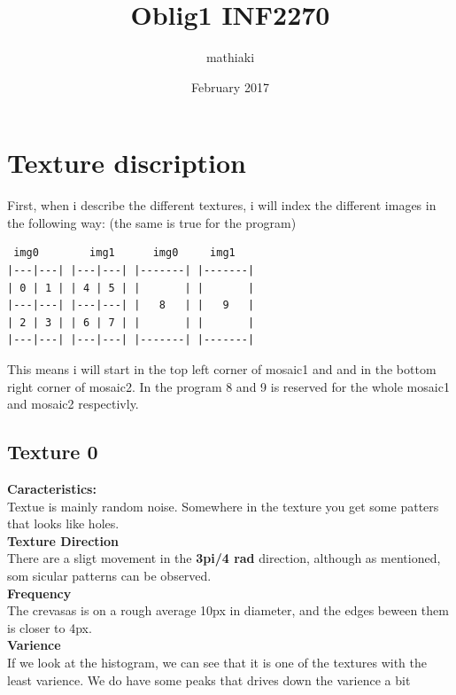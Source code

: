 \documentclass{article}
\title{Oblig1 INF2270}
\author{mathiaki}
\date{February 2017}
\begin{document}
\maketitle

\newpage
\tableofcontents
\newpage

\section{Texture discription}
First, when i describe the different textures, i will index the different images in the following way: (the same is true for the program)\\
\begin{verbatim}
 img0        img1      img0     img1
|---|---| |---|---| |-------| |-------|
| 0 | 1 | | 4 | 5 | |       | |       |
|---|---| |---|---| |   8   | |   9   |
| 2 | 3 | | 6 | 7 | |       | |       |
|---|---| |---|---| |-------| |-------|

\end{verbatim}

This means i will start in the top left corner of mosaic1 and and in the bottom right corner of mosaic2. In the program 8 and 9 is reserved for the whole mosaic1 and mosaic2 respectivly. 

\newpage

\subsection{Texture 0}
\textbf{Caracteristics:}\\
Textue is mainly random noise. Somewhere in the texture you get some patters that looks like holes. \\

\textbf{Texture Direction}\\
There are a sligt movement in the \textbf{3pi/4 rad} direction, although as mentioned, som sicular patterns can be observed. \\

\textbf{Frequency} \\
The crevasas is on a rough average 10px in diameter, and the edges beween them is closer to 4px.\\ 


\textbf{Varience}\\
If we look at the histogram, we can see that it is one of the textures with the least varience. We do have some peaks that drives down the varience a bit\\
\end{document}
